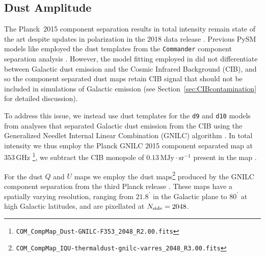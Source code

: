 \subsection{Dust Amplitude}
The Planck~2015 component separation results in total intensity remain state of the art despite updates in polarization in the 2018 data release \citep{planck2016-l04}. Previous PySM models like  employed the dust templates from the \texttt{Commander} component separation analysis \citep{planck2014-a11}. However, the model fitting employed in \citet{planck2014-a11} did not differentiate between Galactic dust emission and the Cosmic Infrared Background (CIB), and so the component separated dust maps retain CIB signal that should not be included in simulations of Galactic emission (see Section~\ref{sec:CIBcontamination} for detailed discussion).

To address this issue, we instead use dust templates for the {\tt d9} and {\tt d10} models from analyses that separated Galactic dust emission from the CIB using the Generalized Needlet Internal Linear Combination (GNILC) algorithm \citep{2011MNRAS.418..467R}. In total intensity we thus employ the Planck GNILC 2015 component separated map at $353$\,GHz \citep{planck2016-XLVIII}\footnote{\texttt{COM\_CompMap\_Dust-GNILC-F353\_2048\_R2.00.fits}}, 
 we subtract the CIB monopole of $0.13\, \text{MJy}\cdot\text{sr}^{-1}$ present in the map \citep[][Section~2.2]{planck2016-l04}.

For the dust $Q$ and $U$ maps we employ the dust maps\footnote{\texttt{COM\_CompMap\_IQU-thermaldust-gnilc-varres\_2048\_R3.00.fits}} produced by the GNILC component separation from the third Planck release \citep{planck2016-l04,planck2016-l11B}. These maps have a spatially varying resolution, ranging from $21.8^\prime$ in the Galactic plane to $80^\prime$ at high Galactic latitudes, and are pixellated at $N_{\rm side} = 2048$. 

